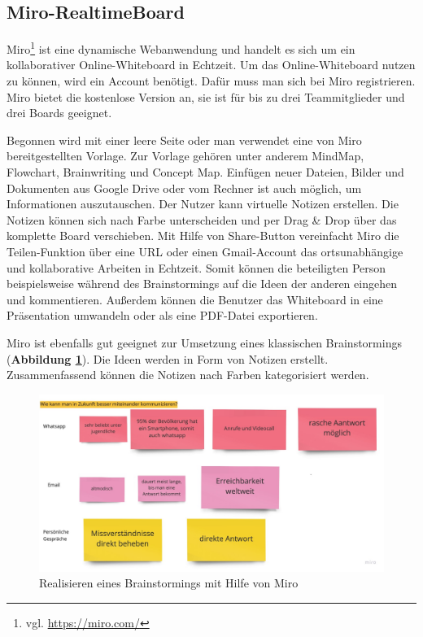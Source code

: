 \subsection{Miro-RealtimeBoard}
\label{sec:miro-realtimeBoard}
Miro\footnote{vgl. \url{https://miro.com/}} ist eine dynamische Webanwendung und handelt es sich um ein kollaborativer Online-Whiteboard in Echtzeit. Um das Online-Whiteboard nutzen zu können, wird ein Account benötigt. Dafür muss man sich bei Miro registrieren. Miro bietet die kostenlose Version an, sie ist für bis zu drei Teammitglieder und drei Boards geeignet.\bigskip

Begonnen wird mit einer leere Seite oder man verwendet eine von Miro bereitgestellten Vorlage. Zur Vorlage gehören unter anderem MindMap, Flowchart, Brainwriting und Concept Map. Einfügen neuer Dateien, Bilder und Dokumenten aus Google Drive oder vom Rechner ist auch möglich, um Informationen auszutauschen. Der Nutzer kann virtuelle Notizen erstellen. Die Notizen können sich nach Farbe unterscheiden und per Drag \& Drop über das komplette Board verschieben. Mit Hilfe von Share-Button vereinfacht Miro die Teilen-Funktion über eine URL oder einen Gmail-Account das ortsunabhängige und kollaborative Arbeiten in Echtzeit. Somit können die beteiligten Person beispielsweise während des Brainstormings auf die Ideen der anderen eingehen und kommentieren. Außerdem können die Benutzer das Whiteboard in eine Präsentation umwandeln oder als eine PDF-Datei exportieren.\bigskip

Miro ist ebenfalls gut geeignet zur Umsetzung eines klassischen Brainstormings (\textbf{Abbildung \ref{fig:miro board}}). Die Ideen werden in Form von Notizen erstellt. Zusammenfassend können die Notizen nach Farben kategorisiert werden.  

\begin{figure}[H]
  \begin{center}
    \includegraphics[scale=0.25]{img/miro1}
	\caption{Realisieren eines Brainstormings mit Hilfe von Miro} 
	\label{fig:miro board}
  \end{center}   
\end{figure}

